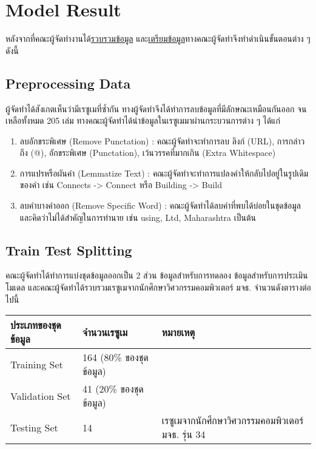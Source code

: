 \section{Model Result}
หลังจากที่คณะผู้จัดทำงานได้\hyperref[subsec:Data Collecting]{รวบรวมข้อมูล} และ\hyperref[subsec:Data Preparation]{เตรียมข้อมูล}ทางคณะผู้จัดทำจึงทำดำเนินขั้นตอนต่าง ๆ ดังนี้
\subsection{Preprocessing Data}
ผู้จัดทำได้สังเกตเห็นว่ามีเรซูเมที่ซ้ำกัน ทางผู้จัดทำจึงได้ทำการลบข้อมูลที่มีลักษณะเหมือนกันออก จนเหลือทั้งหมด 205 เล่ม
ทางคณะผู้จัดทำได้นำข้อมูลในเรซูเมมาผ่านกระบวนการต่าง ๆ ได้แก่
\begin{enumerate}
    \item ลบอักขระพิเศษ (Remove Punctation) : คณะผู้จัดทำจะทำการลบ ลิงก์ (URL), การกล่าวถึง (@), อักขระพิเศษ (Punctation), เว้นวรรคที่มากเกิน (Extra Whitespace)
    \item การแปรหรือผันคำ (Lemmatize Text) : คณะผู้จัดทำจะทำการแปลงคำให้กลับไปอยู่ในรูปเดิมของคำ เช่น Connects -> Connect หรือ Building -> Build
    \item ลบคำบางคำออก (Remove Specific Word) : คณะผู้จัดทำได้ลบคำที่พบได้บ่อยในชุดข้อมูล และคิดว่าไม่ได้สำคัญในการทำนาย เช่น using, Ltd, Maharashtra เป็นต้น
\end{enumerate}
\subsection{Train Test Splitting}
คณะผู้จัดทำได้ทำการแบ่งชุดข้อมูลออกเป็น 2 ส่วน ข้อมูลสำหรับการทดลอง ข้อมูลสำหรับการประเมินโมเดล
และคณะผู้จัดทำได้รวบรวมเรซูเมจากนักศึกษาวิศวกรรมคอมพิวเตอร์ มจธ. จำนวนดังตารางต่อไปนี้
\begin{table}[H]
    \begin{tabularx}{\textwidth}{|X|X|l|} \hline
        ประเภทของชุดข้อมูล & จำนวนเรซูเม            & หมายเหตุ                                   \\ \hline
        Training Set    & 164 (80\% ของชุดข้อมูล) &                                           \\ \hline
        Validation Set  & 41 (20\% ของชุดข้อมูล)  &                                           \\ \hline
        Testing Set     & 14                   & เรซูเมจากนักศึกษาวิศวกรรมคอมพิวเตอร์ มจธ. รุ่น 34 \\ \hline
    \end{tabularx}
\end{table}
